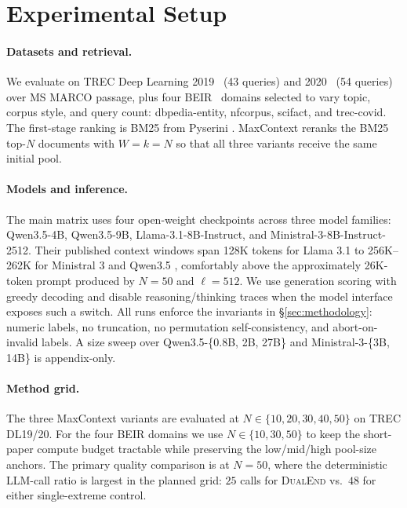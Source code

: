 \section{Experimental Setup}
\label{sec:experimental_setup}

\paragraph{Datasets and retrieval.}
We evaluate on TREC Deep Learning 2019~\citep{craswell2020dl19}
(43 queries) and 2020~\citep{craswell2021dl20} (54 queries) over MS MARCO
passage, plus four BEIR~\citep{thakur2021beir} domains selected to vary
topic, corpus style, and query count: dbpedia-entity, nfcorpus, scifact,
and trec-covid. The first-stage ranking is BM25 from Pyserini
\citep{lin2021pyserini}. MaxContext reranks the BM25 top-$N$ documents
with $W=k=N$ so that all three variants receive the same initial pool.

\paragraph{Models and inference.}
The main matrix uses four open-weight checkpoints across three model
families: Qwen3.5-4B, Qwen3.5-9B, Llama-3.1-8B-Instruct, and
Ministral-3-8B-Instruct-2512. Their published context windows span 128K
tokens for Llama 3.1 to 256K--262K for Ministral 3 and Qwen3.5
\citep{llama31modelcard,ministral3modelcard,qwen35modelcard}, comfortably
above the approximately 26K-token prompt produced by $N{=}50$ and
$\ell{=}512$. We use generation scoring with greedy decoding and disable
reasoning/thinking traces when the model interface exposes such a switch.
All runs enforce the invariants in \S\ref{sec:methodology}: numeric
labels, no truncation, no permutation self-consistency, and
abort-on-invalid labels. A size sweep over Qwen3.5-\{0.8B, 2B, 27B\} and
Ministral-3-\{3B, 14B\} is appendix-only.

\paragraph{Method grid.}
The three MaxContext variants are evaluated at
$N \in \{10,20,30,40,50\}$ on TREC DL19/20. For the four BEIR domains we
use $N \in \{10,30,50\}$ to keep the short-paper compute budget
tractable while preserving the low/mid/high pool-size anchors. The
primary quality comparison is at $N{=}50$, where the deterministic
LLM-call ratio is largest in the planned grid: $25$ calls for
\textsc{DualEnd} vs.\ $48$ for either single-extreme control.

